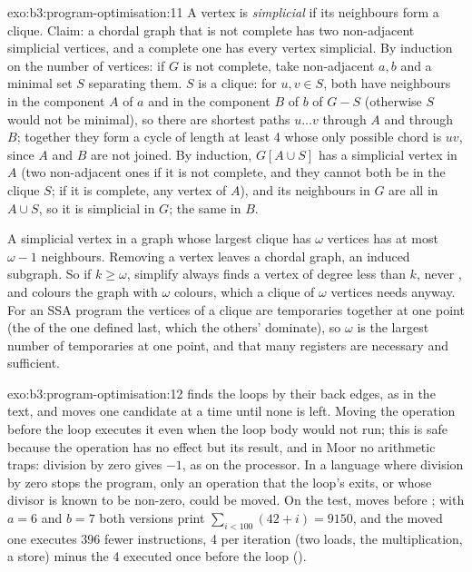 \begin{solution}{exo:b3:program-optimisation:11}
A vertex is \emph{simplicial} if its neighbours form a clique. Claim: a chordal graph that is not complete has two non-adjacent simplicial vertices, and a complete one has every vertex simplicial. By induction on the number of vertices: if $G$ is not complete, take non-adjacent $a, b$ and a minimal set $S$ separating them. $S$ is a clique: for $u, v \in S$, both have neighbours in the component $A$ of $a$ and in the component $B$ of $b$ of $G - S$ (otherwise $S$ would not be minimal), so there are shortest paths $u \dots v$ through $A$ and through $B$; together they form a cycle of length at least 4 whose only possible chord is $uv$, since $A$ and $B$ are not joined. By induction, $G[A \cup S]$ has a simplicial vertex in $A$ (two non-adjacent ones if it is not complete, and they cannot both be in the clique $S$; if it is complete, any vertex of $A$), and its neighbours in $G$ are all in $A \cup S$, so it is simplicial in $G$; the same in $B$.

A simplicial vertex in a graph whose largest clique has $\omega$ vertices has at most $\omega - 1$ neighbours. Removing a vertex leaves a chordal graph, an induced subgraph. So if $k \ge \omega$, simplify always finds a vertex of degree less than $k$, never , and colours the graph with $\omega$ colours, which a clique of $\omega$ vertices needs anyway. For an SSA program the vertices of a clique are temporaries  together at one point (the  of the one defined last, which the others'  dominate), so $\omega$ is the largest number of temporaries  at one point, and that many registers are necessary and sufficient.
\end{solution}

\begin{solution}{exo:b3:program-optimisation:12}
 finds the loops by their back edges, as in the text, and moves one candidate at a time until none is left. Moving the operation before the loop executes it even when the loop body would not run; this is safe because the operation has no effect but its result, and in Moor no arithmetic traps: division by zero gives $-1$, as on the processor. In a language where division by zero stops the program, only an operation that  the loop's exits, or whose divisor is known to be non-zero, could be moved. On the test,  moves before ; with $a = 6$ and $b = 7$ both versions print $\sum_{i < 100} (42 + i) = 9150$, and the moved one executes 396 fewer instructions, 4 per iteration (two loads, the multiplication, a store) minus the 4 executed once before the loop ().
\end{solution}

